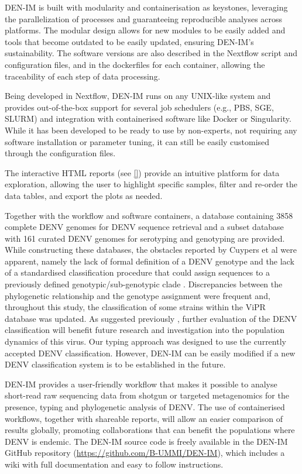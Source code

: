 DEN-IM is built with modularity and containerisation as keystones, leveraging the parallelization of processes and guaranteeing reproducible analyses across platforms. The modular design allows for new modules to be easily added and tools that become outdated to be easily updated, ensuring DEN-IM’s sustainability. The software versions are also described in the Nextflow script and configuration files, and in the dockerfiles for each container, allowing the traceability of each step of data processing.

Being developed in Nextflow, DEN-IM runs on any UNIX-like system and provides out-of-the-box support for several job schedulers (e.g., PBS, SGE, SLURM) and integration with containerised software like Docker or Singularity. While it has been developed to be ready to use by non-experts, not requiring any software installation or parameter tuning, it can still be easily customised through the configuration files.

The interactive HTML reports (see \ref{}) provide an intuitive platform for data exploration, allowing the user to highlight specific samples, filter and re-order the data tables, and export the plots as needed.

Together with the workflow and software containers, a database containing 3858 complete DENV genomes for DENV sequence retrieval and a subset database with 161 curated DENV genomes for serotyping and genotyping are provided. While constructing these databases, the obstacles reported by Cuypers et al \citep{cuypers_time_2018} were apparent, namely the lack of formal definition of a DENV genotype and the lack of a standardised classification procedure that could assign sequences to a previously defined genotypic/sub-genotypic clade \citep{cuypers_time_2018}. Discrepancies between the phylogenetic relationship and the genotype assignment were frequent and, throughout this study, the classification of some strains within the ViPR database \citep{pickett_virus_2012} was updated. As suggested previously \citep{cuypers_time_2018}, further evaluation of the DENV classification will benefit future research and investigation into the population dynamics of this virus. Our typing approach was designed to use the currently accepted DENV classification. However, DEN-IM can be easily modified if a new DENV classification system is to be established in the future.

DEN-IM provides a user-friendly workflow that makes it possible to analyse short-read raw sequencing data from shotgun or targeted metagenomics for the presence, typing and phylogenetic analysis of DENV. The use of containerised workflows, together with shareable reports, will allow an easier comparison of results globally, promoting collaborations that can benefit the populations where DENV is endemic. The DEN-IM source code is freely available in the DEN-IM GitHub repository (\url{https://github.com/B-UMMI/DEN-IM}), which includes a wiki with full documentation and easy to follow instructions.

